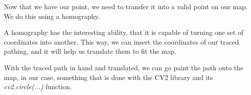 Now that we have our point, we need to transfer it into a valid point on our map. We do this using a homography.

A homography has the interesting ability, that it is capable of turning one set of coordinates into another. This way, we can insert the coordinates of our traced pathing, and it will help us translate them to fit the map.

With the traced path in hand and translated, we can go paint the path onto the map, in our case, something that is done with the CV2 library and its \textsl{cv2.circle(...)} function.